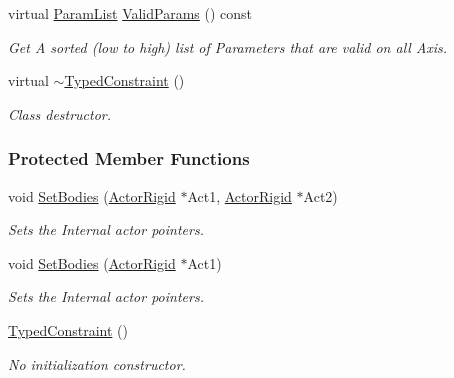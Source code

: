 \begin{DoxyCompactItemize}
virtual \hyperlink{classMezzanine_1_1TypedConstraint_abd499db29c9e9755e9bb547d29eaa49a}{ParamList} \hyperlink{classMezzanine_1_1TypedConstraint_a278d3baf36055e5d10a411139a2d2a7e}{ValidParams} () const 
\begin{DoxyCompactList}\small\item\em Get A sorted (low to high) list of Parameters that are valid on all Axis. \item\end{DoxyCompactList}\item 
virtual \hyperlink{classMezzanine_1_1TypedConstraint_aebd4b22e76d1f693640436083d57f170}{$\sim$TypedConstraint} ()
\begin{DoxyCompactList}\small\item\em Class destructor. \item\end{DoxyCompactList}\end{DoxyCompactItemize}
\subsubsection*{Protected Member Functions}
\begin{DoxyCompactItemize}
\item 
\hypertarget{classMezzanine_1_1TypedConstraint_a82175a88ddca2fe0f7063b7869a1f363}{
void \hyperlink{classMezzanine_1_1TypedConstraint_a82175a88ddca2fe0f7063b7869a1f363}{SetBodies} (\hyperlink{classMezzanine_1_1ActorRigid}{ActorRigid} $\ast$Act1, \hyperlink{classMezzanine_1_1ActorRigid}{ActorRigid} $\ast$Act2)}
\label{classMezzanine_1_1TypedConstraint_a82175a88ddca2fe0f7063b7869a1f363}

\begin{DoxyCompactList}\small\item\em Sets the Internal actor pointers. \item\end{DoxyCompactList}\item 
\hypertarget{classMezzanine_1_1TypedConstraint_a678957e08faf3ded0b81cf4219ce5e77}{
void \hyperlink{classMezzanine_1_1TypedConstraint_a678957e08faf3ded0b81cf4219ce5e77}{SetBodies} (\hyperlink{classMezzanine_1_1ActorRigid}{ActorRigid} $\ast$Act1)}
\label{classMezzanine_1_1TypedConstraint_a678957e08faf3ded0b81cf4219ce5e77}

\begin{DoxyCompactList}\small\item\em Sets the Internal actor pointers. \item\end{DoxyCompactList}\item 
\hyperlink{classMezzanine_1_1TypedConstraint_a850beae54095af9ac2da27050955a338}{TypedConstraint} ()
\begin{DoxyCompactList}\small\item\em No initialization constructor. \item\end{DoxyCompactList}\end{DoxyCompactItemize}
